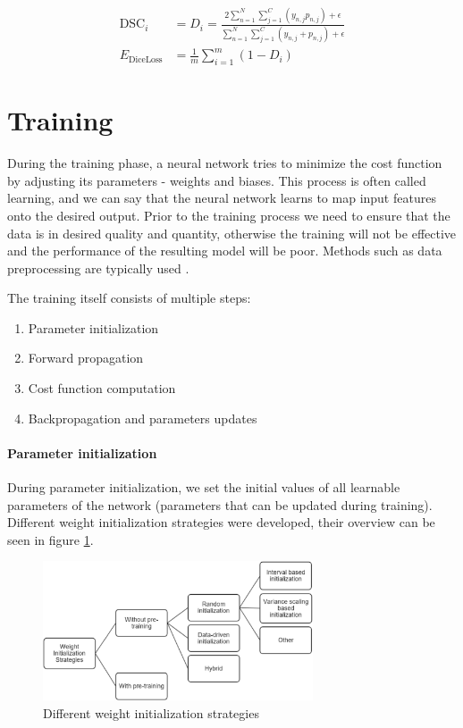 \begin{align}
\label{eq:dsc}
\text{DSC}_i &= D_i = \frac{2 \sum_{n=1}^N \sum_{j=1}^C (y_{n,j} p_{n,j}) + \epsilon}{\sum_{n=1}^N\sum_{j=1}^C (y_{n,j} + p_{n,j}) + \epsilon} \\
\label{eq:diceloss}
E_\text{DiceLoss} &= \frac{1}{m}\sum_{i=1}^m (1-D_i)
\end{align}

\section{Training}
During the training phase, a neural network tries to minimize the cost function by adjusting its parameters - weights and biases. This process is often called learning, and we can say that the neural network learns to map input features onto the desired output. Prior to the training process we need to ensure that the data is in desired quality and quantity, otherwise the training will not be effective and the performance of the resulting model will be poor. Methods such as data preprocessing are typically used \cite{Goodfellow2016, LeCun2015}. 

The training itself consists of multiple steps:

\begin{enumerate}
    \item Parameter initialization
    \item Forward propagation
    \item Cost function computation
    \item Backpropagation and parameters updates
\end{enumerate}

\paragraph{Parameter initialization} During parameter initialization, we set the initial values of all learnable parameters of the network (parameters that can be updated during training). Different weight initialization strategies were developed, their overview can be seen in figure \ref{fig:init}.

\begin{figure}[H]
\begin{centering}
\includegraphics[width=8cm]{assets/images/init.png}
\par\end{centering}
\caption{Different weight initialization strategies \cite{Narkhede2021}}
\label{fig:init}
\end{figure}

